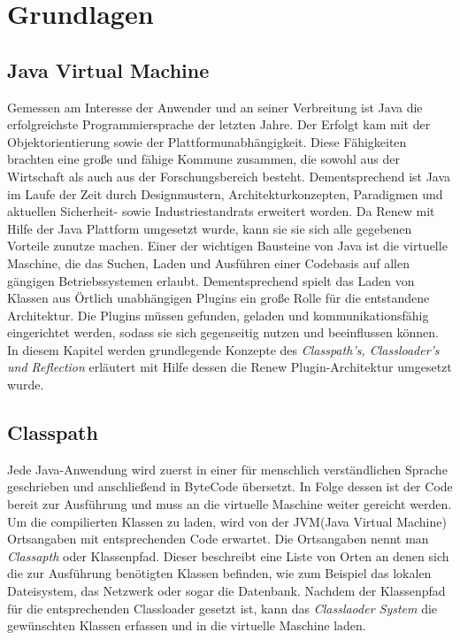 \chapter{Grundlagen} 
\label{cha:Grundlagen}


\section{Java Virtual Machine} 
\label{sec:Java Virtual Machine}
Gemessen am Interesse der Anwender und an seiner Verbreitung ist Java die erfolgreichste Programmiersprache der letzten Jahre. Der Erfolgt kam mit der Objektorientierung sowie der Plattformunabhängigkeit. Diese Fähigkeiten brachten eine große und fähige Kommune zusammen, die sowohl aus der Wirtschaft als auch aus der Forschungsbereich besteht. Dementsprechend ist Java im Laufe der Zeit durch Designmustern, Architekturkonzepten, Paradigmen und aktuellen Sicherheit- sowie Industriestandrats erweitert worden. Da Renew mit Hilfe der Java Plattform umgesetzt wurde, kann sie sie sich alle gegebenen Vorteile zunutze machen. 
Einer der wichtigen Bausteine von Java ist die virtuelle Maschine, die das Suchen, Laden und Ausführen einer Codebasis auf allen gängigen Betriebssystemen erlaubt. Dementsprechend spielt das Laden von Klassen aus Örtlich unabhängigen Plugins ein große Rolle für die entstandene Architektur. Die Plugins müssen gefunden, geladen und kommunikationsfähig eingerichtet werden, sodass sie sich gegenseitig nutzen und beeinflussen können. \newline 
In diesem Kapitel werden grundlegende Konzepte des \textit{ Classpath's, Classloader's und Reflection} erläutert mit Hilfe dessen die Renew Plugin-Architektur umgesetzt wurde.

\section{Classpath}
\label{sub:Classpath}
Jede Java-Anwendung wird zuerst in einer für menschlich verständlichen Sprache geschrieben und anschließend in ByteCode übersetzt. In Folge dessen ist der Code bereit zur Ausführung und muss an die virtuelle Maschine weiter gereicht werden.\newline
Um die compilierten Klassen zu laden, wird von der JVM(Java Virtual Machine) Ortsangaben mit entsprechenden Code erwartet. Die Ortsangaben nennt man \textit{Classapth} oder Klassenpfad. Dieser beschreibt eine Liste von Orten an denen sich die zur Ausführung benötigten Klassen befinden, wie zum Beispiel das lokalen Dateisystem, das Netzwerk oder sogar die Datenbank. Nachdem der Klassenpfad für die entsprechenden Classloader gesetzt ist, kann das \textit{Classlaoder System} die gewünschten Klassen erfassen und in die virtuelle Maschine laden.

